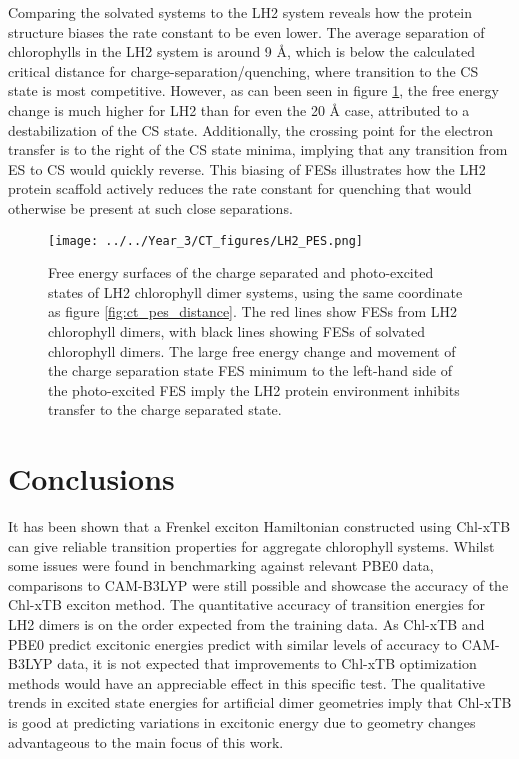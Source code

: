 Comparing the solvated systems to the LH2 system reveals how the protein structure
biases the rate constant to be even lower. The average separation of chlorophylls
in the LH2 system is around 9 \AA{}, which is below the calculated critical distance
for charge-separation/quenching, where transition to the CS state is most competitive\cite{Beddard1976b}.
However, as can been seen in figure \ref{fig:ct_pes_lh2}, the free energy change
is much higher for LH2 than for even the 20 \AA{} case, attributed to a destabilization
of the CS state. Additionally, the crossing point for the electron transfer is to
the right of the CS state minima, implying that any transition from ES to CS would
quickly reverse. This biasing of FESs illustrates how the LH2 protein scaffold actively
reduces the rate constant for quenching that would otherwise be present at such
close separations.

\begin{figure}
    \centering
    \texttt{[image: ../../Year\_3/CT\_figures/LH2\_PES.png]}
    \caption{Free energy surfaces of the charge separated and photo-excited
    states of LH2 chlorophyll dimer systems, using the same coordinate as figure
    \ref{fig:ct_pes_distance}. The red lines show FESs from LH2 chlorophyll dimers,
    with black lines showing FESs of solvated chlorophyll dimers. The large free 
    energy change and movement of the charge separation state FES minimum to the 
    left-hand side of the photo-excited FES imply the LH2 protein environment inhibits 
    transfer to the charge separated state.}
    \label{fig:ct_pes_lh2}
\end{figure}

\section{Conclusions}
\label{sec:exciton_concs}

It has been shown that a Frenkel exciton Hamiltonian constructed using Chl-xTB can
give reliable transition properties for aggregate chlorophyll systems. Whilst some
issues were found in benchmarking against relevant PBE0 data, comparisons to CAM-B3LYP 
were still possible and showcase the accuracy of the Chl-xTB exciton method. The
quantitative accuracy of transition energies for LH2 dimers is on the order expected
from the training data. As Chl-xTB and PBE0 predict excitonic energies predict with
similar levels of accuracy to CAM-B3LYP data, it is not expected that improvements 
to Chl-xTB optimization methods would have an appreciable effect in this specific 
test. The qualitative trends in excited state energies for artificial dimer geometries
imply that Chl-xTB is good at predicting variations in excitonic energy due to geometry 
changes advantageous to the main focus of this work.

